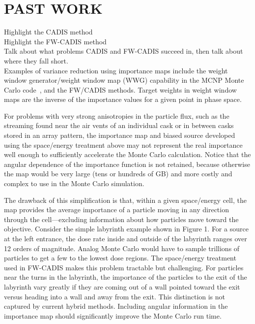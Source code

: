 \documentclass[12pt]{article}
\begin{document}

\section{PAST WORK}
\label{sect::past}
Highlight the CADIS method \\
Highlight the FW-CADIS method \\
Talk about what problems CADIS and FW-CADIS succeed in, then talk about where they fall short. \\

Examples of variance reduction using importance maps include the weight window generator/weight window map (WWG) capability in the MCNP Monte Carlo code~\cite{brown_mcnp_2002}, and the FW/CADIS methods. Target weights in weight window maps are the inverse of the importance values for a given point in phase space.

For problems with very strong anisotropies in the particle flux, such as the streaming found near the air vents of an individual cask or in between casks stored in an array pattern, the importance map and biased source developed using the space/energy treatment above may not represent the real importance well enough to sufficiently accelerate the Monte Carlo calculation. Notice that the angular dependence of the importance function is not retained, because otherwise the map would be very large (tens or hundreds of GB) and more costly and complex to use in the Monte Carlo simulation. 

The drawback of this simplification is that, within a given space/energy cell, the map provides the average importance of a particle moving in any direction through the cell—excluding information about how particles move toward the objective. Consider the simple labyrinth example shown in Figure 1. For a source at the left entrance, the dose rate inside and outside of the labyrinth ranges over 12 orders of magnitude. Analog Monte Carlo would have to sample trillions of particles to get a few to the lowest dose regions. The space/energy treatment used in FW-CADIS makes this problem tractable but challenging. For particles near the turns in the labyrinth, the importance of the particles to the exit of the labyrinth vary greatly if they are coming out of a wall pointed toward the exit versus heading into a wall and away from the exit. This distinction is not captured by current hybrid methods. Including angular information in the importance map should significantly improve the Monte Carlo run time. 
\end{document}
